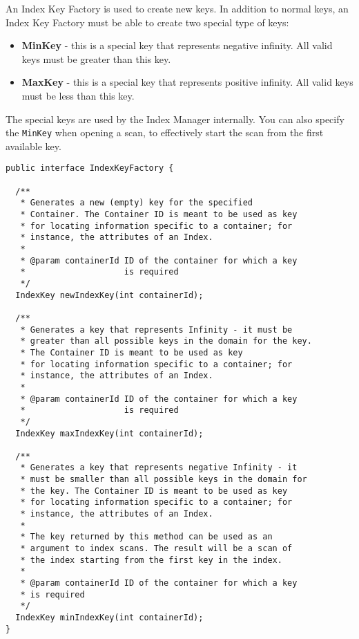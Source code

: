 \documentclass[a4paper,draft,oneside]{book}
\begin{document}
An Index Key Factory is used to create new keys. In addition to normal
keys, an Index Key Factory must be able to create two special type of
keys:

\begin{itemize}
\item \textbf{MinKey} - this is a special key that represents negative
  infinity. All valid keys must be greater than this key.
\item \textbf{MaxKey} - this is a special key that represents positive
  infinity. All valid keys must be less than this key.
\end{itemize}

The special keys are used by the Index Manager internally. You can
also specify the \verb|MinKey| when opening a scan, to effectively
start the scan from the first available key.

\begin{verbatim}
public interface IndexKeyFactory {

  /**
   * Generates a new (empty) key for the specified
   * Container. The Container ID is meant to be used as key
   * for locating information specific to a container; for 
   * instance, the attributes of an Index.
   * 
   * @param containerId ID of the container for which a key 
   *                    is required
   */
  IndexKey newIndexKey(int containerId);

  /**
   * Generates a key that represents Infinity - it must be 
   * greater than all possible keys in the domain for the key. 
   * The Container ID is meant to be used as key
   * for locating information specific to a container; for 
   * instance, the attributes of an Index.
   * 
   * @param containerId ID of the container for which a key 
   *                    is required
   */
  IndexKey maxIndexKey(int containerId);
	
  /**
   * Generates a key that represents negative Infinity - it 
   * must be smaller than all possible keys in the domain for 
   * the key. The Container ID is meant to be used as key
   * for locating information specific to a container; for 
   * instance, the attributes of an Index.
   *
   * The key returned by this method can be used as an
   * argument to index scans. The result will be a scan of 
   * the index starting from the first key in the index.
   * 
   * @param containerId ID of the container for which a key 
   * is required
   */
  IndexKey minIndexKey(int containerId);
}
\end{verbatim}
\end{document}
